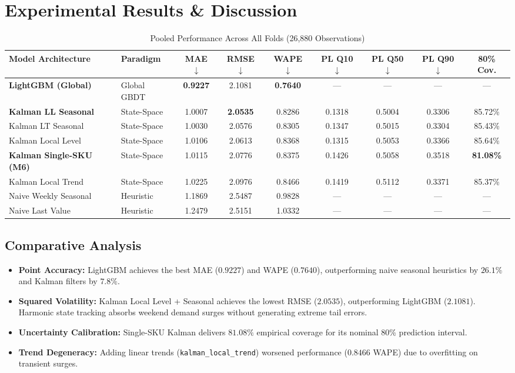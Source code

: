 \documentclass[11pt,a4paper]{article}
\begin{document}
\section{Experimental Results \& Discussion}

\begin{table}[htbp]
\centering
\caption{Pooled Performance Across All Folds (26,880 Observations)}
\label{tab:main_results}
\begin{tabular}{llccccccc}
\toprule
\textbf{Model Architecture} & \textbf{Paradigm} & \textbf{MAE $\downarrow$} & \textbf{RMSE $\downarrow$} & \textbf{WAPE $\downarrow$} & \textbf{PL Q10 $\downarrow$} & \textbf{PL Q50 $\downarrow$} & \textbf{PL Q90 $\downarrow$} & \textbf{80\% Cov.} \\
\midrule
\textbf{LightGBM (Global)} & Global GBDT & \textbf{0.9227} & 2.1081 & \textbf{0.7640} & --- & --- & --- & --- \\
\textbf{Kalman LL Seasonal} & State-Space & 1.0007 & \textbf{2.0535} & 0.8286 & 0.1318 & 0.5004 & 0.3306 & 85.72\% \\
Kalman LT Seasonal & State-Space & 1.0030 & 2.0576 & 0.8305 & 0.1347 & 0.5015 & 0.3304 & 85.43\% \\
Kalman Local Level & State-Space & 1.0106 & 2.0613 & 0.8368 & 0.1315 & 0.5053 & 0.3366 & 85.64\% \\
\textbf{Kalman Single-SKU (M6)} & State-Space & 1.0115 & 2.0776 & 0.8375 & 0.1426 & 0.5058 & 0.3518 & \textbf{81.08\%} \\
Kalman Local Trend & State-Space & 1.0225 & 2.0976 & 0.8466 & 0.1419 & 0.5112 & 0.3371 & 85.37\% \\
Naive Weekly Seasonal & Heuristic & 1.1869 & 2.5487 & 0.9828 & --- & --- & --- & --- \\
Naive Last Value & Heuristic & 1.2479 & 2.5151 & 1.0332 & --- & --- & --- & --- \\
\bottomrule
\end{tabular}
\end{table}

\subsection{Comparative Analysis}
\begin{itemize}
    \item \textbf{Point Accuracy:} LightGBM achieves the best MAE ($0.9227$) and WAPE ($0.7640$), outperforming naive seasonal heuristics by $26.1\%$ and Kalman filters by $7.8\%$.
    \item \textbf{Squared Volatility:} Kalman Local Level + Seasonal achieves the lowest RMSE ($2.0535$), outperforming LightGBM ($2.1081$). Harmonic state tracking absorbs weekend demand surges without generating extreme tail errors.
    \item \textbf{Uncertainty Calibration:} Single-SKU Kalman delivers $81.08\%$ empirical coverage for its nominal 80\% prediction interval.
    \item \textbf{Trend Degeneracy:} Adding linear trends (\texttt{kalman\_local\_trend}) worsened performance ($0.8466$ WAPE) due to overfitting on transient surges.
\end{itemize}
\end{document}
